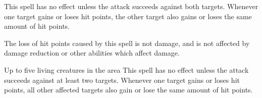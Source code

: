 \begin{spellheader}
\end{spellheader}
\begin{spelleffects}
    \spelldur{\durshort}
    \spellspecial This spell has no effect unless the attack succeeds against both targets.
    \spellsuccess Whenever one target gains or loses hit points, the other target also gains or loses the same amount of hit points.
\end{spelleffects}
\begin{spellfooter}
    \spellnotes The loss of hit points caused by this spell is not damage, and is not affected by damage reduction or other abilities which affect damage.
\end{spellfooter}

\begin{spellheader}
    \spelldur{\durshort}
\end{spellheader}
\begin{spelleffects}
    \begin{spelltargets}{Up to five living creatures in the area}
        \spellspecial This spell has no effect unless the attack succeeds against at least two targets.
        \spellsuccess Whenever one target gains or loses hit points, all other affected targets also gain or lose the same amount of hit points.
    \end{spelltargets}
\end{spelleffects}
\begin{spellfooter}
    
\end{spellfooter}

